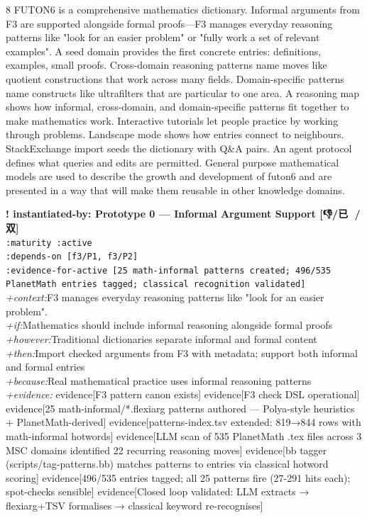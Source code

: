 \documentclass[landscape]{article}
\newcommand{\flexitag}[1]{\textcolor[gray]{0.35}{\textit{#1}}}
\newenvironment{devmapactive}{%
  \def\FrameCommand{\colorbox{devmapactivebg}}%
  \setlength{\fboxsep}{2pt}%
  \MakeFramed{\advance\hsize-\width \FrameRestore}%
}{\endMakeFramed}
\begin{document}
\begin{paracol}{8}
FUTON6 is a comprehensive mathematics dictionary. Informal arguments from F3 are supported alongside formal proofs—F3 manages everyday reasoning patterns like "look for an easier problem" or "fully work a set of relevant examples". A seed domain provides the first concrete entries: definitions, examples, small proofs. Cross-domain reasoning patterns name moves like quotient constructions that work across many fields. Domain-specific patterns name constructs like ultrafilters that are particular to one area. A reasoning map shows how informal, cross-domain, and domain-specific patterns fit together to make mathematics work. Interactive tutorials let people practice by working through problems. Landscape mode shows how entries connect to neighbours. StackExchange import seeds the dictionary with Q\&A pairs. An agent protocol defines what queries and edits are permitted. General purpose mathematical models are used to describe the growth and development of futon6 and are presented in a way that will make them reusable in other knowledge domains.\\
\par
\par
\begin{devmapactive}
\textbf{! instantiated-by: Prototype 0 — Informal Argument Support [👎/已 🍍/双]}\\
  \texttt{:\allowbreak{}maturity :\allowbreak{}active}\\
  \texttt{:\allowbreak{}depends-\allowbreak{}on [f3/\allowbreak{}P1,\allowbreak{} f3/\allowbreak{}P2]}\\
  \texttt{:\allowbreak{}evidence-\allowbreak{}for-\allowbreak{}active [25 math-\allowbreak{}informal patterns created;\allowbreak{} 496/\allowbreak{}535 PlanetMath entries tagged;\allowbreak{} classical recognition validated]}\\
  \flexitag{+context:}F3 manages everyday reasoning patterns like "look for an easier problem".\\
  \flexitag{+if:}Mathematics should include informal reasoning alongside formal proofs\\
  \flexitag{+however:}Traditional dictionaries separate informal and formal content\\
  \flexitag{+then:}Import checked arguments from F3 with metadata; support both informal and formal entries\\
  \flexitag{+because:}Real mathematical practice uses informal reasoning patterns\\
  \flexitag{+evidence:} evidence[F3 pattern canon exists] evidence[F3 check DSL operational] evidence[25 math-informal/*.flexiarg patterns authored — Polya-style heuristics + PlanetMath-derived] evidence[patterns-index.tsv extended: 819→844 rows with math-informal hotwords] evidence[LLM scan of 535 PlanetMath .tex files across 3 MSC domains identified 22 recurring reasoning moves] evidence[bb tagger (scripts/tag-patterns.bb) matches patterns to entries via classical hotword scoring] evidence[496/535 entries tagged; all 25 patterns fire (27-291 hits each); spot-checks sensible] evidence[Closed loop validated: LLM extracts → flexiarg+TSV formalises → classical keyword re-recognises]\\

\end{devmapactive}
\end{paracol}
\end{document}
